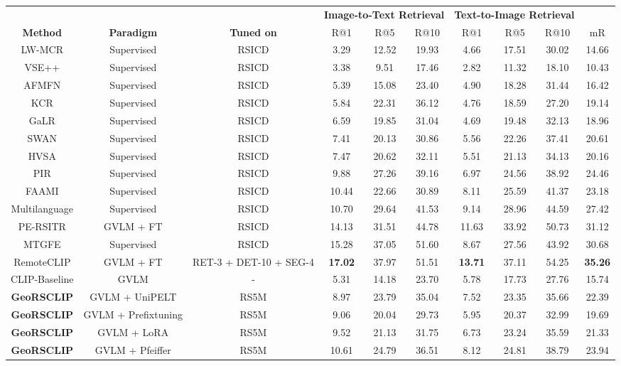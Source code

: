 \documentclass[journal]{IEEEtran}
\begin{document}
\begin{table*}
\label{table:i2t_t2i}
\centering
\footnotesize
\setlength{\tabcolsep}{7pt}
\begin{tabular}{cccccccccc}
\toprule
\multicolumn{3}{c}{} & \multicolumn{3}{c}{\textbf{Image-to-Text Retrieval}} & \multicolumn{3}{c}{\textbf{Text-to-Image Retrieval}} & \multicolumn{1}{c}{} \\
\cmidrule(rl){4-6} \cmidrule(rl){7-9}
\textbf{Method}  & \textbf{Paradigm} & \textbf{Tuned on} & {R@1} & {R@5} & {R@10} & {R@1} & {R@5} & {R@10} & {mR} \\
\midrule
LW-MCR \cite{LW-MCR}  & Supervised & RSICD&3.29  & 12.52  & 19.93  &  4.66  & 17.51   & 30.02  &  14.66 \\ 
VSE++ \cite{vse++}  & Supervised & RSICD &  3.38  & 9.51  & 17.46  & 2.82  & 11.32  & 18.10  & 10.43  \\
AFMFN \cite{RSITMD} & Supervised & RSICD &  5.39  & 15.08  & 23.40  & 4.90  & 18.28  & 31.44  & 16.42  \\
KCR \cite{kcr}  & Supervised & RSICD &  5.84  & 22.31  & 36.12  & 4.76  & 18.59  & 27.20  & 19.14  \\
GaLR \cite{galr}  & Supervised & RSICD &  6.59  & 19.85  & 31.04  & 4.69  & 19.48  & 32.13  & 18.96  \\
SWAN  & Supervised & RSICD & 7.41  & 20.13  & 30.86  & 5.56  & 22.26  & 37.41  & 20.61  \\
HVSA \cite{hvsa}  & Supervised & RSICD&7.47 &20.62 &32.11 &5.51 &21.13 &34.13 & 20.16  \\ 
PIR \cite{pir}  & Supervised & RSICD& 9.88   & 27.26   & 39.16  & 6.97   & 24.56   & 38.92  & 24.46 \\ 
FAAMI \cite{Zheng_2023}  & Supervised & RSICD& 10.44  & 22.66  & 30.89  & 8.11  &  25.59  & 41.37  & 23.18  \\ 
Multilanguage \cite{multilingual}  &Supervised & RSICD &10.70 & 29.64& 41.53& 9.14&28.96 &44.59 & 27.42\\
PE-RSITR \cite{yuan2023parameterefficient}  &GVLM + FT& RSICD & 14.13 & 31.51 & 44.78 & 11.63 & 33.92 & 50.73 & 31.12\\
MTGFE \cite{MTGFE}  &Supervised& RSICD & 15.28& 37.05 & 51.60 & 8.67& 27.56& 43.92 & 30.68\\
RemoteCLIP \cite{liu2023remoteclip}  & GVLM + FT & RET-3 + DET-10 + SEG-4 & \textbf{17.02} & 37.97& 51.51& \textbf{13.71} & 37.11 & 54.25 & \textbf{35.26} \\
CLIP-Baseline \cite{clip}  & GVLM & - &	5.31  & 14.18  & 23.70  & 5.78  &	17.73  & 27.76  & 15.74   \\
\textbf{GeoRSCLIP}  &GVLM + UniPELT & RS5M & 8.97  &23.79  &  35.04  &7.52  & 23.35  & 35.66  & 22.39 \\
\textbf{GeoRSCLIP}  &GVLM + Prefix\-tuning & RS5M & 9.06  & 20.04  & 29.73  & 5.95  & 20.37   & 32.99   & 19.69 \\
\textbf{GeoRSCLIP}  &GVLM + LoRA& RS5M & 9.52   & 21.13  & 31.75  &  6.73  & 23.24  & 35.59  & 21.33  \\
\textbf{GeoRSCLIP}   &GVLM + Pfeiffer & RS5M &  10.61  & 24.79  & 36.51  & 8.12  & 24.81   & 38.79  & 23.94 \\


\end{tabular}
\end{table*}
\end{document}

